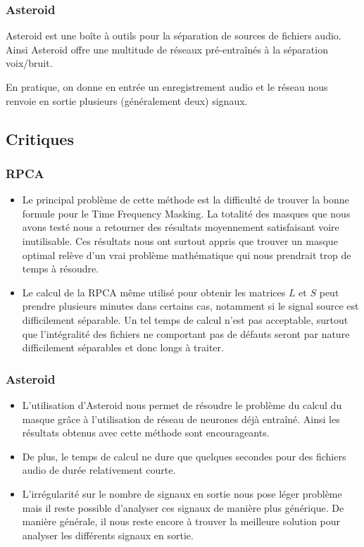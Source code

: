 \documentclass{article}
\begin{document}
\subsubsection{Asteroid}

Asteroid est une boîte à outils pour la séparation de sources de fichiers audio. Ainsi Asteroid offre une multitude de réseaux pré-entraînés à la séparation voix/bruit.

En pratique, on donne en entrée un enregistrement audio et le réseau nous renvoie en sortie plusieurs (généralement deux) signaux.

\subsection{Critiques}

\subsubsection{RPCA}

\begin{itemize}
    \item Le principal problème de cette méthode est la difficulté de trouver la bonne formule pour le Time Frequency Masking. La totalité des masques que nous avons testé nous a retourner des résultats moyennement satisfaisant voire inutilisable. Ces résultats nous ont surtout appris que trouver un masque optimal relève d'un vrai problème mathématique qui nous prendrait trop de temps à résoudre.
    
    \item Le calcul de la RPCA même utilisé pour obtenir les matrices $L$ et $S$ peut prendre plusieurs minutes dans certains cas, notamment si le signal source est difficilement séparable. Un tel temps de calcul n'est pas acceptable, surtout que l'intégralité des fichiers ne comportant pas de défauts seront par nature difficilement séparables et donc longs à traiter.
\end{itemize}

\subsubsection{Asteroid}

\begin{itemize}
    \item L'utilisation d'Asteroid nous permet de résoudre le problème du calcul du masque grâce à l'utilisation de réseau de neurones déjà entraîné. Ainsi les résultats obtenus avec cette méthode sont encourageants.
    
    \item De plus, le temps de calcul ne dure que quelques secondes pour des fichiers audio de durée relativement courte.
    
    \item L'irrégularité sur le nombre de signaux en sortie nous pose léger problème mais il reste possible d'analyser ces signaux de manière plus générique.
    De manière générale, il nous reste encore à trouver la meilleure solution pour analyser les différents signaux en sortie.
\end{itemize}
\end{document}

